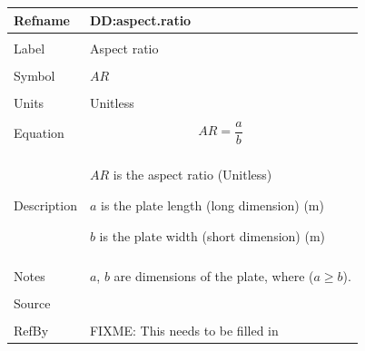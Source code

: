 \documentclass[12pt]{article}
\begin{document}
\noindent \begin{minipage}{\textwidth}
\begin{tabular}{p{} p{}}
\toprule \textbf{Refname} & \textbf{DD:aspect.ratio}
\label{DD:aspect.ratio}
\\ \midrule \\
Label & Aspect ratio
\\ \midrule \\
Symbol & $AR$
\\ \midrule \\
Units & Unitless
\\ \midrule \\
Equation & \begin{dmath}
           AR=\frac{a}{b}
           \end{dmath}
\\ \midrule \\
Description & \begin{symbDescription}
              \item{$AR$ is the aspect ratio (Unitless)}
              \item{$a$ is the plate length (long dimension) (m)}
              \item{$b$ is the plate width (short dimension) (m)}
              \end{symbDescription}
\\ \midrule \\
Notes & $a$, $b$ are dimensions of the plate, where ($a\geq{}b$).
\\ \midrule \\
Source & 
\\ \midrule \\
RefBy & FIXME: This needs to be filled in
\\ \bottomrule \end{tabular}
\end{minipage}\\
\end{document}
